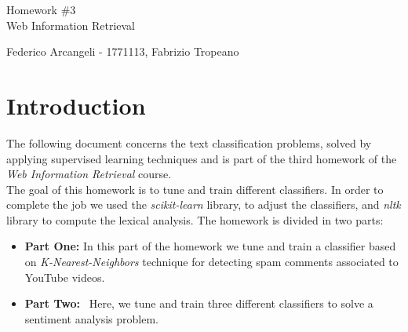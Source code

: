 \documentclass[11pt]{article}
\begin{document}
\begin{titlepage}
	\begin{center}
		\vspace*{\fill}
		\begin{Huge}
			Homework \#3\\
			
			
			Web Information Retrieval
		\end{Huge}
		\newline
		\newline
		Federico Arcangeli \-- 1771113, Fabrizio Tropeano \\
		\vspace*{\fill}	
	\end{center}
\end{titlepage}


\section{Introduction}
The following document concerns the text classification problems, solved by applying supervised learning techniques and is part of the third homework of the \textit{Web Information Retrieval} course.\\
The goal of this homework is to tune and train different classifiers. In order to complete the job we used the \textit{scikit-learn} library, to adjust the classifiers, and \textit{nltk} library to compute the lexical analysis.
The homework is divided in two parts: \\
\begin{itemize}
\item{\textbf{Part One:} } In this part of the homework we tune and train a classifier based on \textit{K-Nearest-Neighbors} technique for detecting spam comments associated to YouTube videos.
\item{\textbf{Part Two:} } Here, we tune and train three different classifiers to solve a sentiment analysis problem.
\end{itemize}
\end{document}
